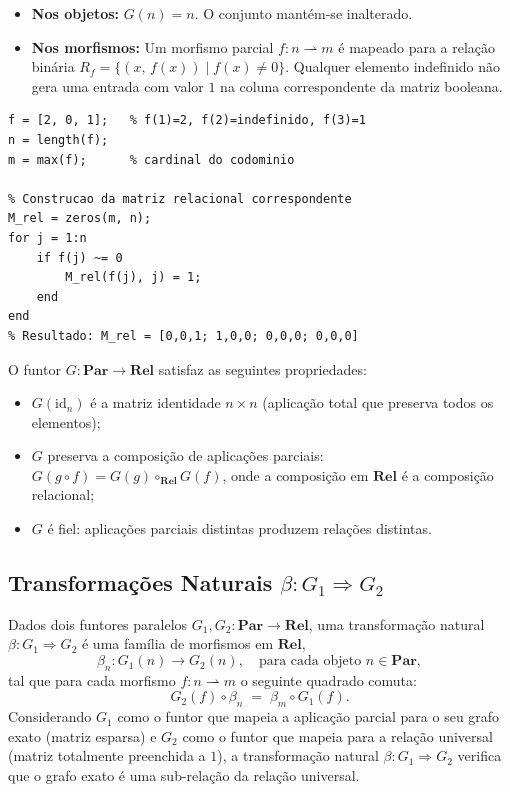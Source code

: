 \begin{itemize}
    \item \textbf{Nos objetos:} $G(n) = n$. O conjunto mantém-se inalterado.
    \item \textbf{Nos morfismos:} Um morfismo parcial $f: n \rightharpoonup m$ é mapeado para a relação binária $R_f = \{(x,\, f(x)) \mid f(x) \neq 0\}$. Qualquer elemento indefinido não gera uma entrada com valor $1$ na coluna correspondente da matriz booleana.
\end{itemize}

\begin{lstlisting}[style=matlab, caption={Funtor $G$ aplicado a uma aplicação parcial $f: 3 \rightharpoonup 4$}]
f = [2, 0, 1];   % f(1)=2, f(2)=indefinido, f(3)=1
n = length(f);
m = max(f);      % cardinal do codominio

% Construcao da matriz relacional correspondente
M_rel = zeros(m, n);
for j = 1:n
    if f(j) ~= 0
        M_rel(f(j), j) = 1;
    end
end
% Resultado: M_rel = [0,0,1; 1,0,0; 0,0,0; 0,0,0]
\end{lstlisting}

\begin{proposition}
O funtor $G: \mathbf{Par} \to \mathbf{Rel}$ satisfaz as seguintes propriedades:
\begin{itemize}
    \item $G(\mathrm{id}_n)$ é a matriz identidade $n \times n$ (aplicação total que preserva todos os elementos);
    \item $G$ preserva a composição de aplicações parciais: $G(g \circ f) = G(g) \circ_{\mathbf{Rel}} G(f)$, onde a composição em $\mathbf{Rel}$ é a composição relacional;
    \item $G$ é fiel: aplicações parciais distintas produzem relações distintas.
\end{itemize}
\end{proposition}

\subsection{Transformações Naturais \texorpdfstring{$\beta: G_1 \Rightarrow G_2$}{beta: G1 => G2}}

Dados dois funtores paralelos $G_1, G_2: \mathbf{Par} \to \mathbf{Rel}$, uma transformação natural $\beta: G_1 \Rightarrow G_2$ é uma família de morfismos em $\mathbf{Rel}$,
\[
    \beta_n : G_1(n) \to G_2(n), \quad \text{para cada objeto } n \in \mathbf{Par},
\]
tal que para cada morfismo $f: n \rightharpoonup m$ o seguinte quadrado comuta:
\[
    G_2(f) \circ \beta_n \;=\; \beta_m \circ G_1(f).
\]
Considerando $G_1$ como o funtor que mapeia a aplicação parcial para o seu grafo exato (matriz esparsa) e $G_2$ como o funtor que mapeia para a relação universal (matriz totalmente preenchida a $1$), a transformação natural $\beta: G_1 \Rightarrow G_2$ verifica que o grafo exato é uma sub-relação da relação universal.

